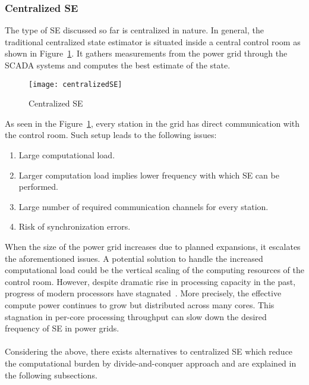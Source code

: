 \documentclass[thesis.tex]{subfiles}
\begin{document}
\subsubsection{Centralized SE}
The type of SE discussed so far is centralized in nature. In general, the traditional centralized state estimator is situated inside a central control room as shown in Figure~\ref{fig:centralizedSE}. It gathers measurements from the power grid through the SCADA systems and computes the best estimate of the state. 
\begin{figure}[H]
	\centering
	\texttt{[image: centralizedSE]}
	\caption{Centralized SE}
	\label{fig:centralizedSE}
\end{figure}
As seen in the Figure~\ref{fig:centralizedSE}, every station in the grid has direct communication with the control room. Such setup leads to the following issues:
\begin{enumerate}
	\item Large computational load.
	\item Larger computation load implies lower frequency with which SE can be performed.
	\item Large number of required communication channels for every station.
	\item Risk of synchronization errors.
\end{enumerate}
When the size of the power grid increases due to planned expansions, it escalates the aforementioned issues. A potential solution to handle the increased computational load could be the vertical scaling of the computing resources of the control room. However, despite dramatic rise in processing capacity in the past, progress of modern processors have stagnated~\cite{cpuStag}. More precisely, the effective compute power continues to grow but distributed across many cores. This stagnation in per-core processing throughput can slow down the desired frequency of SE in power grids. \\\\
Considering the above, there exists alternatives to centralized SE which reduce the computational burden by divide-and-conquer approach and are explained in the following subsections.
\end{document}
